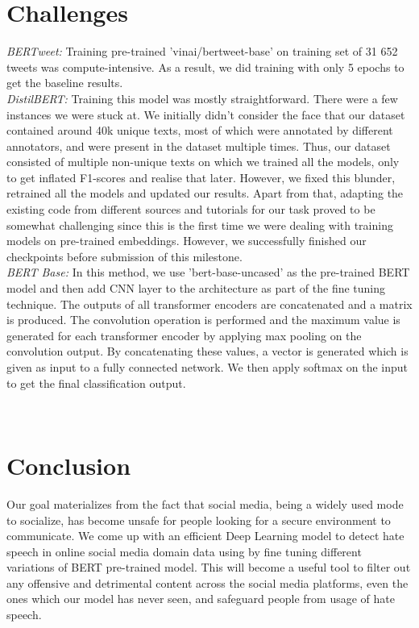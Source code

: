 \documentclass[a4paper, 10pt, conference]{IEEEtran}
\begin{document}
{{{\section{Challenges}
\noindent\textit{BERTweet:}
Training pre-trained 'vinai/bertweet-base' on training set of 31 652 tweets was compute-intensive. As a result, we did training with only 5 epochs to get the baseline results.\\

\noindent\textit{DistilBERT:}
Training this model was mostly straightforward. There were a few instances we were stuck at. We initially didn't consider the face that our dataset contained around 40k unique texts, most of which were annotated by different annotators, and were present in the dataset multiple times. Thus, our dataset consisted of multiple non-unique texts on which we trained all the models, only to get inflated F1-scores and realise that later. However, we fixed this blunder, retrained all the models and updated our results. Apart from that, adapting the existing code from different sources and tutorials for our task proved to be somewhat challenging since this is the first time we were dealing with training models on pre-trained embeddings. However, we successfully finished our checkpoints before submission of this milestone.\\

\noindent\textit{BERT Base:}
In this method, we use 'bert-base-uncased' as the pre-trained BERT model and then add CNN layer to the architecture as part of the fine tuning technique. The outputs of all transformer encoders are concatenated and a matrix is produced. The convolution operation is performed and the maximum value is generated for each transformer encoder by applying max pooling on the convolution output. By concatenating these values, a vector is generated which is given as input to a fully connected network. We then apply softmax on the input to get the final classification output.}\\

\section{Conclusion}
Our goal materializes from the fact that social media, being a widely used mode to socialize, has become unsafe for people looking for a secure environment to communicate. We come up with an efficient Deep Learning model to detect hate speech in online social media domain data using by fine tuning different variations of BERT pre-trained model. This will become a useful tool to filter out any offensive and detrimental content across the social media platforms, even the ones which our model has never seen, and safeguard people from usage of hate speech.

}}
\end{document}
